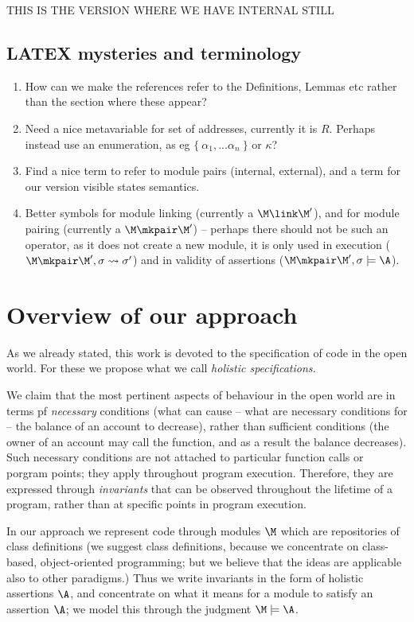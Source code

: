 THIS IS THE VERSION WHERE WE HAVE INTERNAL STILL

 \subsection*{LATEX mysteries and terminology}
 \begin{enumerate}
 \item
 How can we make the references refer to the Definitions, Lemmas etc rather than the section where these appear?
 \item
 Need a nice metavariable for set of addresses, currently it is $R$. Perhaps instead use an enumeration, as eg $\{ \ \alpha_1,...\alpha_n\ \} $
 or $\kappa$?
\item
Find a nice term  to refer to module pairs  (internal, external), and a term for 
our version visible states semantics.
\item
Better symbols for module linking (currently a $\M\link\M'$), and 
for module pairing (currently a $\M\mkpair \M'$) -- perhaps there should not be such an operator, as
it does not create a new module, it is only used in execution ($\M\mkpair \M', \sigma \leadsto \sigma'$) and in validity of assertions ($\M\mkpair \M', \sigma\models \A$).
 \end{enumerate} 


\section{Overview of our approach}

As we already stated, this work is devoted to the specification of code in the open world. For these we propose what we call {\em holistic specifications.}

We claim that the most pertinent aspects of behaviour in the open world 
are   in terms pf  {\em necessary} conditions (\eg what can cause -- what are necessary conditions for --
 the balance of an account to decrease), rather than sufficient conditions (\eg the owner of an account may 
 call the  function, and as a result the balance decreases). 
Such necessary conditions are not attached to particular function calls or porgram points; they apply
throughout program execution. 
Therefore, they are expressed through  {\em invariants} that can be observed throughout the lifetime of a program, rather than at specific points in program execution.

In our approach we represent code through modules $\M$ which are repositories of class definitions (we suggest class definitions, because we concentrate on class-based, object-oriented programming; but we believe that the ideas are applicable also to other paradigms.) Thus we write invariants in the form of holistic assertions $\A$, and concentrate on what it means for a module to satisfy an assertion $\A$; we model this through the judgment $\M \models \A$.

